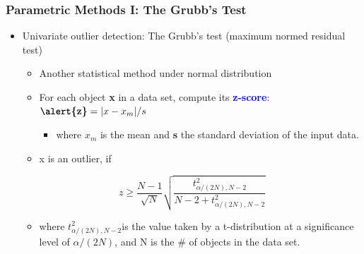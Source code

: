 \documentclass[aspectratio=169,t,xcolor=dvipsnames]{beamer}
\newcommand{\blue}[1]{\textbf{\textcolor{blue}{#1}}}
\begin{document}
\begin{frame}
	\frametitle{Parametric Methods I: The Grubb's Test}
	\begin{itemize}
		\item Univariate outlier detection: The Grubb's test (maximum normed residual test)
		      \begin{itemize}
		      	\item Another statistical method under normal distribution
		      	\item For each object \textbf{\alert{x}} in a data set, compute its \blue{z-score}:  $\textbf{\alert{z}} = | x - x_m | / s$
		      	      \begin{itemize}
		      	      	\item where \textbf{\alert{$x_m$}} is the mean and \textbf{\alert{s}} the standard deviation of the input data.
		      	      \end{itemize}
		      	\item x is an outlier, if
		      \end{itemize}
		$$ z \geq \frac{N-1}{\sqrt{N}} \sqrt{\frac{t^2_{\alpha/(2N),N-2}}{N-2 + t^2_{\alpha/(2N),N-2}}} $$
		      \begin{itemize}
		      	\item where $t^2_{\alpha/(2N),N-2}$is the value taken by a t-distribution at a significance level of $\alpha / (2N)$, and N is the \# of objects in the data set.
		      \end{itemize}
	\end{itemize}
\end{frame}

%
\end{document}
